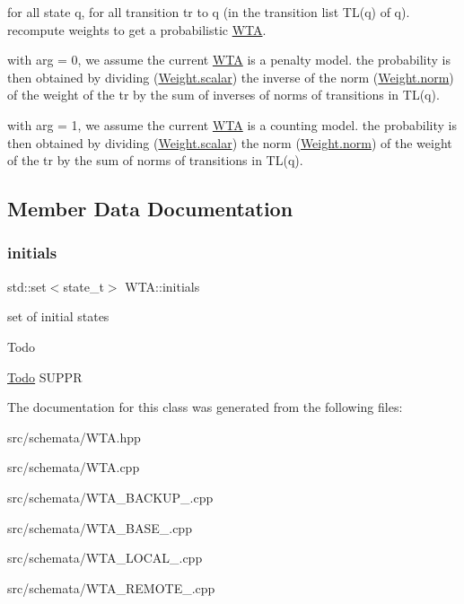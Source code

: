 for all state q, for all transition tr to q (in the transition list T\+L(q) of q). recompute weights to get a probabilistic \mbox{\hyperlink{classWTA}{W\+TA}}. 

with arg = 0, we assume the current \mbox{\hyperlink{classWTA}{W\+TA}} is a penalty model. the probability is then obtained by dividing (\mbox{\hyperlink{group__weight_ga5d63ead0a1d21ee5628c643fca773903}{Weight.\+scalar}}) the inverse of the norm (\mbox{\hyperlink{group__weight_ga68bd9621500f31ba5f0fbe04dc5a00e4}{Weight.\+norm}}) of the weight of the tr by the sum of inverses of norms of transitions in T\+L(q).

with arg = 1, we assume the current \mbox{\hyperlink{classWTA}{W\+TA}} is a counting model. the probability is then obtained by dividing (\mbox{\hyperlink{group__weight_ga5d63ead0a1d21ee5628c643fca773903}{Weight.\+scalar}}) the norm (\mbox{\hyperlink{group__weight_ga68bd9621500f31ba5f0fbe04dc5a00e4}{Weight.\+norm}}) of the weight of the tr by the sum of norms of transitions in T\+L(q). 

\subsection{Member Data Documentation}
\mbox{\label{classWTA_a5d8ace9f515a3902d889db560f08f4c5}} 
\subsubsection{\texorpdfstring{initials}{initials}}
{\footnotesize\ttfamily std\+::set$<$state\+\_\+t$>$ W\+T\+A\+::initials}



set of initial states 

\begin{DoxyRefDesc}{Todo}
\item[\mbox{\hyperlink{todo__todo000021}{Todo}}]S\+U\+P\+PR \end{DoxyRefDesc}


The documentation for this class was generated from the following files\+:\begin{DoxyCompactItemize}
\item 
src/schemata/W\+T\+A.\+hpp\item 
src/schemata/W\+T\+A.\+cpp\item 
src/schemata/W\+T\+A\+\_\+\+B\+A\+C\+K\+U\+P\+\_.\+cpp\item 
src/schemata/W\+T\+A\+\_\+\+B\+A\+S\+E\+\_.\+cpp\item 
src/schemata/W\+T\+A\+\_\+\+L\+O\+C\+A\+L\+\_.\+cpp\item 
src/schemata/W\+T\+A\+\_\+\+R\+E\+M\+O\+T\+E\+\_.\+cpp\end{DoxyCompactItemize}
